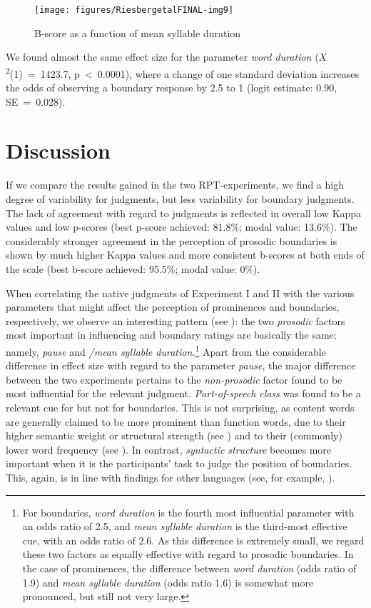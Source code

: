 \documentclass[output=paper
,modfonts
,nonflat]{langsci/langscibook}
\begin{document}
\begin{figure}
	\texttt{[image: figures/RiesbergetalFINAL-img9]}
	\caption{B-score as a function of mean syllable duration}
	\label{f:riesberg:9}
\end{figure}

We found almost the same effect size for the parameter \textit{word duration} (\textit{$X$}\textsuperscript{2}(1)~=~1423.7, p~<~0.0001), where a change of one standard deviation increases the odds of observing a boundary response by 2.5 to 1 (logit estimate: 0.90, SE~=~0.028). 

\section{\label{s:riesberg:5}Discussion}

If we compare the results gained in the two RPT-experiments, we find a high degree of variability for  judgments, but less variability for boundary judgments. The lack of agreement with regard to  judgments is reflected in overall low Kappa values and low p-scores (best p-score achieved: 81.8\%; modal value: 13.6\%). The considerably stronger agreement in the perception of prosodic boundaries is shown by much higher Kappa values and more consistent b-scores at both ends of the scale (best b-score achieved: 95.5\%; modal value: 0\%).

When correlating the native judgments of Experiment I and II with the various parameters that might affect the perception of prominences and boundaries, respectively, we observe an interesting pattern (see ): the two \textit{prosodic} factors most important in influencing  and boundary ratings are basically the same; namely, \textit{pause} and \textit{/mean syllable duration.}\footnote{For boundaries, \textit{word duration} is the fourth most influential parameter with an odds ratio of 2.5, and \textit{mean syllable duration} is the third-most effective cue, with an odds ratio of 2.6. As this difference is extremely small, we regard these two factors as equally effective with regard to prosodic boundaries. In the case of prominences, the difference between \textit{word duration} (odds ratio of 1.9) and \textit{mean syllable duration} (odds ratio 1.6) is somewhat more pronounced, but still not very large.} Apart from the considerable difference in effect size with regard to the parameter \textit{pause}, the major difference between the two experiments pertains to the \textit{non-prosodic} factor found to be most influential for the relevant judgment. \textit{Part-of-speech} \textit{class} was found to be a relevant cue for  but not for boundaries. This is not surprising, as content words are generally claimed to be more prominent than function words, due to their higher semantic weight or structural strength (see \citealt{Büring2012}) and to their (commonly) lower word frequency (see \citealt{Cole2010a}). In contrast, \textit{syntactic structure} becomes more important when it is the participants’ task to judge the position of boundaries. This, again, is in line with findings for other languages (see, for example, \citealt{Cole2010b}).
\end{document}
